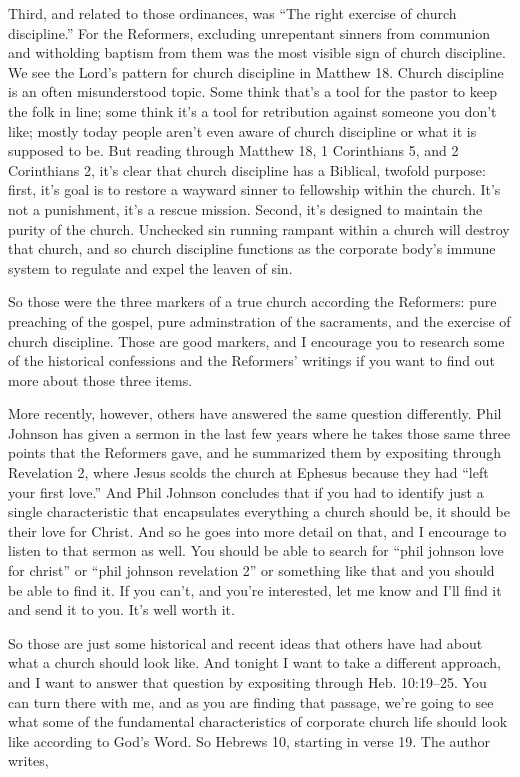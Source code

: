 \documentclass[letterpaper, 12pt]{article}
\begin{document}
    Third, and related to those ordinances, was
    ``The right exercise of church discipline.'' For the Reformers,
    excluding unrepentant sinners from communion and witholding baptism
    from them was the most visible sign of church discipline. We see
    the Lord's pattern for church discipline in Matthew 18. Church
    discipline is an often misunderstood topic. Some think that's a tool
    for the pastor to keep the folk in line; some think it's a tool for
    retribution against someone you don't like; mostly today people
    aren't even aware of church discipline or what it is supposed to be.
    But reading through Matthew 18, 1 Corinthians 5, and 2 Corinthians
    2, it's clear that church discipline has a Biblical, twofold
    purpose: first, it's goal is to restore a wayward sinner to
    fellowship within the church. It's not a punishment, it's a rescue
    mission. Second, it's designed to maintain the purity of the church.
    Unchecked sin running rampant within a church will destroy that
    church, and so church discipline functions as the corporate body's
    immune system to regulate and expel the leaven of sin.

    So those were the three markers of a true church
    according the Reformers: pure preaching of the gospel, pure
    adminstration of the sacraments, and the exercise of church
    discipline. Those are good markers, and I encourage you to research
    some of the historical confessions and the Reformers' writings if
    you want to find out more about those three items.

    More recently, however, others have answered the same question
    differently. Phil Johnson has given a sermon in the last few years
    where he takes those same three points that the Reformers gave, and
    he summarized them by expositing through Revelation 2, where Jesus
    scolds the church at Ephesus because they had ``left your first
    love.'' And Phil Johnson concludes that if you had to identify just
    a single characteristic that encapsulates everything a church should
    be, it should be their love for Christ. And so he goes into more
    detail on that, and I encourage to listen to that sermon as well.
    You should be able to search for ``phil johnson love for christ'' or
    ``phil johnson revelation 2'' or something like that and you should
    be able to find it. If you can't, and you're interested, let me know
    and I'll find it and send it to you. It's well worth it.

    So those are just some historical and recent ideas that others have
    had about what a church should look like. And tonight I want to take
    a different approach, and I want to answer that question by
    expositing through Heb. 10:19--25. You can turn there with me, and
    as you are finding that passage, we're going to see what some of the
    fundamental characteristics of corporate church life should look
    like according to God's Word. So Hebrews 10, starting in verse 19.
    The author writes,
\end{document}
